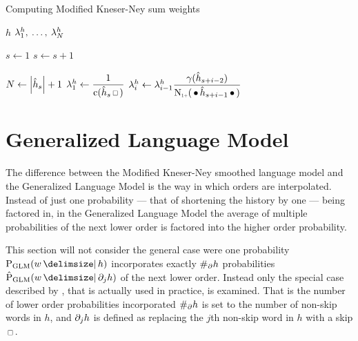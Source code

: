\begin{algorithm}
  \caption{Computing Modified Kneser-Ney sum weights}
  \label{alg:weightedsum-mkn}
  \begin{algorithmic}[1]
    \Require $h$
    \Ensure $\lambda_1^h, \: \ldots, \: \lambda_N^h$

    \State $s \gets 1$
      \State $s \gets s + 1$
    \EndWhile

    \vspace{0.7em}
    \State $N \gets \NGramLength{\DerivedHistory[s]} + 1$
    \vspace{0.1em}
    \State $\SumWeight_1^h \gets \dfrac{1}{\Count(\DerivedHistory[s] \Skp)}$
      \State $\SumWeight_i^h \gets \SumWeight_{i-1}^h \dfrac{\gamma(\DerivedHistory[s + i - 2])}{\ContCountIp(\WSkp \DerivedHistory[s + i - 1] \WSkp)}$
        \label{ln:alg-mkn-lowerorders}
    \EndFor
  \end{algorithmic}
\end{algorithm}


\clearpage
\section{Generalized Language Model}
\label{sec:weightedsum-glm}

The difference between the Modified Kneser-Ney smoothed language model and the
Generalized Language Model is the way in which orders are interpolated.
Instead of just one probability --- that of shortening the history by one ---
being factored in, in the Generalized Language Model the average of multiple
probabilities of the next lower order is factored into the higher order
probability.

This section will not consider the general case were one probability
$\ProbGLM{w}{h}$ incorporates exactly $\NumSkpOp{h}$ probabilities
$\ProbGLM*{w}{\SkpOp[j]{h}}$ of the next lower order.
Instead only the special case described by \textcite{Pickhardt2014}, that is
actually used in practice, is examined.
That is the number of lower order probabilities incorporated $\NumSkpOp{h}$
is set to the number of non-skip words in $h$, and $\SkpOp[j]{h}$ is defined as
replacing the $j$th non-skip word in $h$ with a skip $\Skp$.

